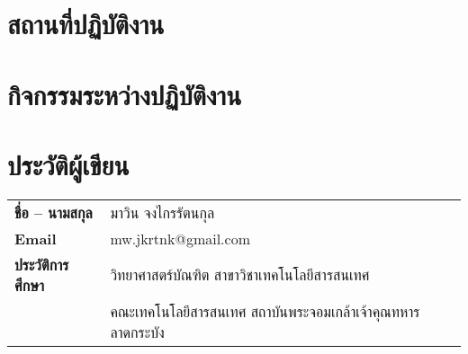 \chapter{สถานที่ปฏิบัติงาน}

\chapter{กิจกรรมระหว่างปฏิบัติงาน}

\chapter{ประวัติผู้เขียน}
\begin{tabularx}{\linewidth}{lX}
	\textbf{ชื่อ – นามสกุล} & มาวิน จงไกรรัตนกุล \\
	\textbf{Email} & mw.jkrtnk@gmail.com \\
	\textbf{ประวัติการศึกษา} & วิทยาศาสตร์​บัณฑิต สาขาวิชาเทคโนโลยีสารสนเทศ \\ & คณะเทคโนโลยีสารสนเทศ สถาบันพระจอมเกล้าเจ้าคุณทหารลาดกระบัง \\
\end{tabularx}